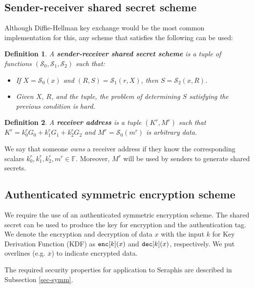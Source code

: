 \documentclass{article}
\theoremstyle{plain}
\newtheorem{definition}{Definition}[section]
\theoremstyle{remark}
\begin{document}
\subsection{Sender-receiver shared secret scheme}
Although Diffie-Hellman key exchange would be the most common implementation for this, any scheme that satisfies the following can be used:
\begin{definition}\label{sha-sec}
A \textbf{\em sender-receiver shared secret scheme} is a tuple of functions $(\mathcal{S}_0, \mathcal{S}_1, \mathcal{S}_2)$ such that:
    \begin{itemize}
        \item If $X = \mathcal{S}_0(x)$ and $(R, S) = \mathcal{S}_1(r, X)$, then $S = \mathcal{S}_2(x, R)$.
        \item Given $X$, $R$, and the tuple, the problem of determining $S$ satisfying the previous condition is hard.
    \end{itemize}
\end{definition}

\begin{definition}\label{recv-addr}
A \textbf{\em receiver address} is a tuple $(K^r, M^r)$  such that $K^r = k_0^r G_0 + k_1^r G_1 + k_2^r G_2$ and $M^r = \mathcal{S}_0(m^r)$ is arbitrary data.
\end{definition}
We say that someone \textit{owns} a receiver address if they know the corresponding scalars $k_0^r, k_1^r, k_2^r, m^r \in\mathbb{F}$. Moreover, $M^r$ will be used by senders to generate shared secrets.

\subsection{Authenticated symmetric encryption scheme}
We require the use of an authenticated symmetric encryption scheme. The shared secret can be used to produce the key for encryption and the authentication tag. We denote the encryption and decryption of data $x$ with the input $k$ for Key Derivation Function (KDF) as ${\tt enc}[k](x)$ and ${\tt dec}[k](x)$, respectively. We put overlines (e.g. $\overline{x}$) to indicate encrypted data.

The required security properties for application to Seraphis are described in Subsection \ref{sec-symm}.
\end{document}
